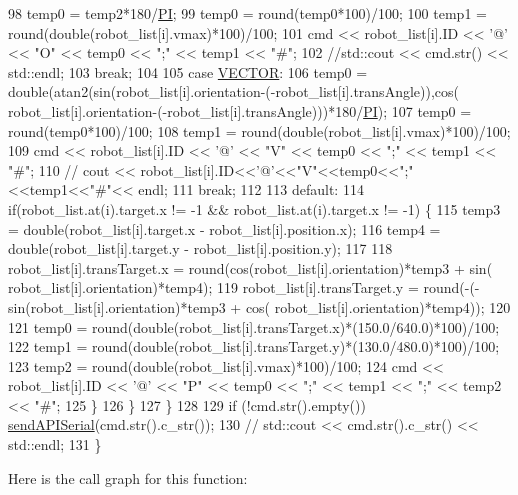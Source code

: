 \begin{DoxyCode}
98                 temp0 = temp2*180/\hyperlink{camcap_8hpp_a598a3330b3c21701223ee0ca14316eca}{PI};
99                 temp0 = round(temp0*100)/100;
100                 temp1 = round(\textcolor{keywordtype}{double}(robot\_list[i].vmax)*100)/100;
101                 cmd << robot\_list[i].ID << \textcolor{charliteral}{'@'} << \textcolor{stringliteral}{"O"} << temp0 << \textcolor{stringliteral}{";"} << temp1 << \textcolor{stringliteral}{"#"};
102                 \textcolor{comment}{//std::cout << cmd.str() << std::endl;}
103                 \textcolor{keywordflow}{break};
104 
105             \textcolor{keywordflow}{case} \hyperlink{serial_w_8hpp_ac6e89954deaa373db52a91ac6db50884}{VECTOR}:
106                 temp0 = double(atan2(sin(robot\_list[i].orientation-(-robot\_list[i].transAngle)),cos(
      robot\_list[i].orientation-(-robot\_list[i].transAngle)))*180/\hyperlink{camcap_8hpp_a598a3330b3c21701223ee0ca14316eca}{PI});
107                 temp0 = round(temp0*100)/100;
108                 temp1 = round(\textcolor{keywordtype}{double}(robot\_list[i].vmax)*100)/100;
109                 cmd << robot\_list[i].ID << \textcolor{charliteral}{'@'} << \textcolor{stringliteral}{"V"} << temp0 << \textcolor{stringliteral}{";"} << temp1 << \textcolor{stringliteral}{"#"};
110                 \textcolor{comment}{// cout << robot\_list[i].ID<<'@'<<"V"<<temp0<<";"<<temp1<<"#"<< endl;}
111                 \textcolor{keywordflow}{break};
112 
113             \textcolor{keywordflow}{default}:
114                 \textcolor{keywordflow}{if}(robot\_list.at(i).target.x != -1 && robot\_list.at(i).target.x != -1) \{
115                     temp3 = double(robot\_list[i].target.x - robot\_list[i].position.x);
116                     temp4 = double(robot\_list[i].target.y - robot\_list[i].position.y);
117 
118                     robot\_list[i].transTarget.x = round(cos(robot\_list[i].orientation)*temp3 + sin(
      robot\_list[i].orientation)*temp4);
119                     robot\_list[i].transTarget.y = round(-(-sin(robot\_list[i].orientation)*temp3 + cos(
      robot\_list[i].orientation)*temp4));
120 
121                     temp0 = round(\textcolor{keywordtype}{double}(robot\_list[i].transTarget.x)*(150.0/640.0)*100)/100;
122                     temp1 = round(\textcolor{keywordtype}{double}(robot\_list[i].transTarget.y)*(130.0/480.0)*100)/100;
123                     temp2 = round(\textcolor{keywordtype}{double}(robot\_list[i].vmax)*100)/100;
124                     cmd << robot\_list[i].ID << \textcolor{charliteral}{'@'} << \textcolor{stringliteral}{"P"} << temp0 << \textcolor{stringliteral}{";"} << temp1 << \textcolor{stringliteral}{";"} << temp2 << \textcolor{stringliteral}{"#"};
125                 \}
126         \}
127     \}
128 
129     \textcolor{keywordflow}{if} (!cmd.str().empty()) \hyperlink{class_serial_w_a482e8608c6048b44b0772fecf8a922d9}{sendAPISerial}(cmd.str().c\_str());
130     \textcolor{comment}{// std::cout << cmd.str().c\_str() << std::endl;}
131 \}
\end{DoxyCode}
Here is the call graph for this function\+:
\mbox{\label{class_serial_w_a67953d9f4d61a9caeb562d94821d9f03}} 
